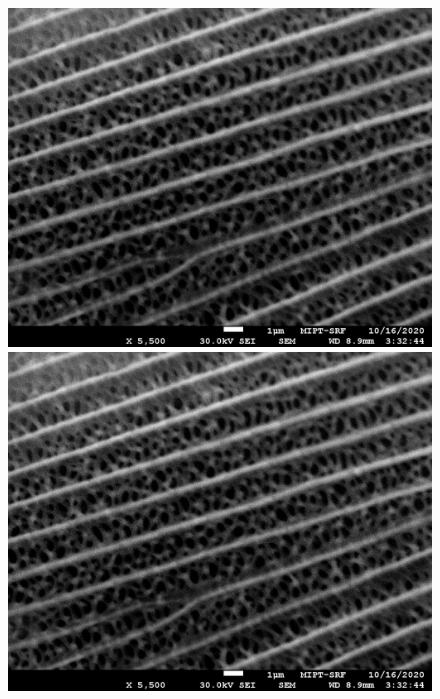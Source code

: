 \documentclass[a4paper]{article}
\begin{document}
\begin{enumerate}
    \begin{figure}[H]
        \begin{center}
        \begin{minipage}[h]{0.45\linewidth}
        \includegraphics[width=1\linewidth]{Buterfly03.jpg}
        \caption{} 
        \label{Buterfly03}
        \end{minipage}
        \hfill 
        \begin{minipage}[h]{0.45\linewidth}
        \includegraphics[width=1\linewidth]{Buterfly03.jpg}
        \caption{}
        \label{Buterfly04}
        \end{minipage}
        \end{center}
    \end{figure}
    

\end{enumerate}
\end{document}
